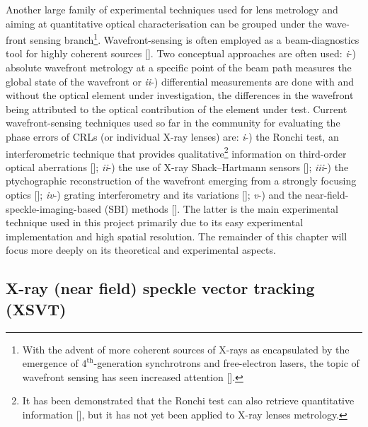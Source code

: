 \begin{refsection}
Another large family of experimental techniques used for lens metrology and aiming at quantitative optical characterisation can be grouped under the wave-front sensing branch\footnote{With the advent of more coherent sources of X-rays as encapsulated by the emergence of $4^{\text{th}}$-generation synchrotrons and free-electron lasers, the topic of wavefront sensing has seen increased attention [\cite{Seaberg2019}].}. Wavefront-sensing is often employed as a beam-diagnostics tool for highly coherent sources [\cite{Seaberg2019}]. Two conceptual approaches are often used: \textit{i}-) absolute wavefront metrology at a specific point of the beam path measures the global state of the wavefront or \textit{ii}-) differential measurements are done with and without the optical element under investigation, the differences in the wavefront being attributed to the optical contribution of the element under test. Current wavefront-sensing techniques used so far in the community for evaluating the phase errors of CRLs (or individual X-ray lenses) are: \textit{i}-) the Ronchi test, an interferometric technique that provides qualitative\footnote{It has been demonstrated that the Ronchi test can also retrieve quantitative information [\cite{Lee2010}], but it has not yet been applied to X-ray lenses metrology.} information on third-order optical aberrations [\cite{Nilsson2012, Uhlen2014}]; \textit{ii}-) the use of X-ray Shack–Hartmann sensors [\cite{Mayo2004, Mercere2005, Mikhaylov2020}]; \textit{iii}-) the ptychographic reconstruction of the wavefront emerging from a strongly focusing optics [\cite{Schropp2013,Sala2017,Seiboth2017}]; \textit{iv}-) grating interferometry and its variations [\cite{David2012,Koch2016,Grizolli2017}]; \textit{v}-) and the near-field-speckle-imaging-based (SBI) methods [\cite{Berujon2013,Zdora2018,Berujon2020a}]. The latter is the main experimental technique used in this project primarily due to its easy experimental implementation and high spatial resolution. The remainder of this chapter will focus more deeply on its theoretical and experimental aspects.


\subsection{X-ray (near field) speckle vector tracking (XSVT)}\label{sec:XSVT}


\end{refsection}
